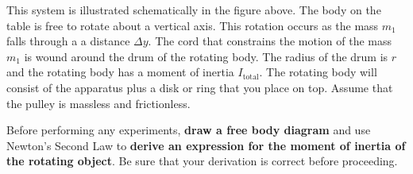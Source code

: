 \documentclass[11pt,letterpaper]{article}
\begin{document}
This system is illustrated schematically in the figure above.  The body on the table is free to rotate about a vertical axis. This rotation occurs as the mass $m_1$ falls through a a distance $\Delta{y}$. The cord that constrains the motion of the mass $m_1$ is wound around the drum of the rotating body. The radius of the drum is $r$ and the rotating body has a moment of inertia $I_{\mbox{total}}$. The rotating body will consist of the apparatus plus a disk or ring that you place on top. Assume that the pulley is massless and frictionless.

Before performing any experiments, \textbf{draw a free body diagram} and use Newton's Second Law to \textbf{derive an expression for the moment of inertia of the rotating object}. Be sure that your derivation is correct before proceeding.
\end{document}
